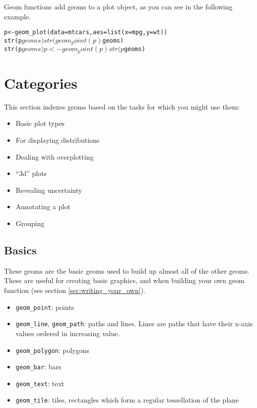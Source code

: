Geom functions add geoms to a plot object, as you can see in the following example.

\begin{alltt}
p <- geom_plot(data=mtcars, aes=list(x=mpg, y=wt))
str(p$geoms) 
str(geom_point(p)$geoms)
str(p$geoms)
p <- geom_point(p)
str(p$geoms)
\end{alltt}

\section{Categories}\label{sec:categories}

This section indexes geoms based on the tasks for which you might use them: 

\begin{itemize}
	\item Basic plot types
	\item For displaying distributions
	\item Dealing with overplotting
	\item ``3d'' plots
	\item Revealing uncertainty
	\item Annotating a plot
	\item Grouping
\end{itemize}


\subsection{Basics}\label{sub:basics}

These geoms are the basic geoms used to build up almost all of the other geoms.  These are useful for creating basic graphics, and when building your own geom function (see section \ref{sec:writing_your_own}).

\begin{itemize}
  \item {\tt geom\_point}: points
  \item {\tt geom\_line}, {\tt geom\_path}: paths and lines.  Lines are paths that have their x-axis values ordered in increasing value.
  \item {\tt geom\_polygon}: polygons
  \item {\tt geom\_bar}: bars
  \item {\tt geom\_text}: text
  \item {\tt geom\_tile}: tiles, rectangles which form a regular tessellation of the plane
\end{itemize}

